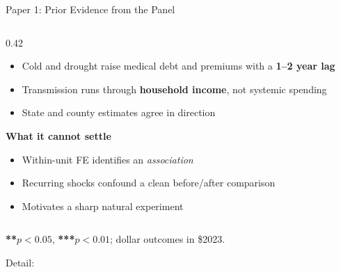 \documentclass[aspectratio=169,11pt]{beamer}
\newcommand{\emphcolor}[1]{{\color{WarmOrange}\textbf{#1}}}
\newcommand{\tealtext}[1]{{\color{Teal}#1}}
\newcommand{\graytext}[1]{{\color{WarmGray}#1}}
\begin{document}
\begin{frame}[label=p1prior]{Paper 1: Prior Evidence from the Panel}
\begin{columns}[T]
\begin{column}{0.42\textwidth}
      \begin{itemize}\itemsep0.12em
        \item Cold and drought raise medical debt and premiums with a \emphcolor{1--2 year lag}
        \item Transmission runs through \emphcolor{household income}, not systemic spending
        \item State and county estimates agree in direction
      \end{itemize}
      \vspace{0.3em}
      \textbf{\tealtext{What it cannot settle}}
      \begin{itemize}\itemsep0.12em
        \item Within-unit FE identifies an \emph{association}
        \item Recurring shocks confound a clean before/after comparison
        \item Motivates a sharp natural experiment
      \end{itemize}
    \end{column}
  \end{columns}
  \vspace{0.1em}
  \begin{center}\graytext{\scriptsize \emphcolor{**}\(p{<}0.05\), \emphcolor{***}\(p{<}0.01\); dollar outcomes in \$2023.}\end{center}
  \vspace{-0.2em}\hfill{\scriptsize Detail: \hyperlink{appxstate}{}\,\hyperlink{appxcounty}{}}
\end{frame}
\end{document}
